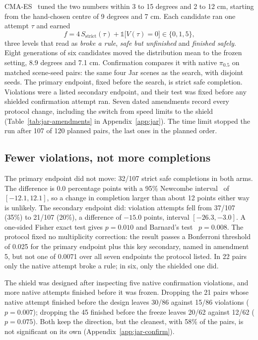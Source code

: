 CMA-ES~\cite{hansen2001cma} tuned the two numbers within 3 to 15 degrees
and 2 to 12 cm, starting from the hand-chosen centre of 9 degrees and 7 cm.
Each candidate ran one attempt $\tau$ and earned
\begin{equation}\label{eq:jarfit}
f=4\,S_{\mathrm{strict}}(\tau)+\mathds 1\bigl[V(\tau)=0\bigr]\in\{0,1,5\},
\end{equation}
three levels that read as \emph{broke a rule}, \emph{safe but unfinished}
and \emph{finished safely}. Eight generations of six candidates moved the
distribution mean to the frozen setting, 8.9 degrees and 7.1 cm.
Confirmation compares it with native $\pi_{0.5}$ on matched scene-seed
pairs: the same four Jar scenes as the search, with disjoint seeds. The
primary endpoint, fixed before the search, is strict safe completion.
Violations were a listed secondary endpoint, and their test was fixed before
any shielded confirmation attempt ran. Seven dated amendments record every
protocol change, including the switch from speed limits to the shield
(Table~\ref{tab:jar-amendments} in Appendix~\ref{app:jar}). The time limit
stopped the run after 107 of 120 planned pairs, the last ones in the planned
order.

\subsection{Fewer violations, not more completions}
The primary endpoint did not move: 32/107 strict safe completions in both
arms. The difference is 0.0 percentage points with a 95\% Newcombe
interval~\cite{newcombe1998interval} of $[-12.1,12.1]$, so a change in
completion larger than about 12 points either way is unlikely. The secondary
endpoint did: violation attempts fell from 37/107 (35\%) to 21/107 (20\%),
a difference of $-15.0$ points, interval $[-26.3,-3.0]$. A one-sided Fisher exact test gives $p=0.010$ and Barnard's
test~\cite{barnard1945test} $p=0.008$. The protocol fixed no multiplicity
correction: the result passes a Bonferroni threshold of 0.025 for the primary
endpoint plus this key secondary, named in amendment 5, but not one of 0.0071 over all seven endpoints the protocol listed. In 22 pairs only the native attempt broke a rule; in six, only the
shielded one did.

The shield was designed after inspecting five native confirmation
violations, and more native attempts finished before it was frozen.
Dropping the 21 pairs whose native attempt finished before the design leaves
30/86 against 15/86 violations ($p=0.007$); dropping the 45 finished before
the freeze leaves 20/62 against 12/62 ($p=0.075$). Both keep the direction,
but the cleanest, with 58\% of the pairs, is not significant on its own
(Appendix~\ref{app:jar-confirm}).

